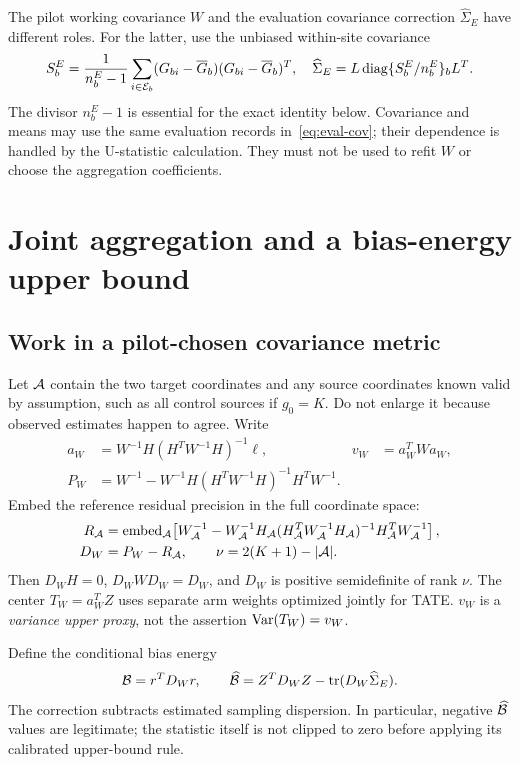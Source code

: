 The pilot working covariance $W$ and the evaluation covariance correction
$\widehat\Sigma_E$ have different roles. For the latter, use the unbiased
within-site covariance
\begin{equation}
 S_b^E=\frac{1}{n_b^E-1}\sum_{i\in\mathcal E_b}
 (G_{bi}-\overline G_b)(G_{bi}-\overline G_b)^T,
 \quad\widehat\Sigma_E=L\operatorname{diag}\{S_b^E/n_b^E\}_bL^T.\label{eq:eval-cov}
\end{equation}
The divisor $n_b^E-1$ is essential for the exact identity below. Covariance
and means may use the same evaluation records in~\eqref{eq:eval-cov}; their
dependence is handled by the U-statistic calculation. They must not be used
to refit $W$ or choose the aggregation coefficients.

\section{Joint aggregation and a bias-energy upper bound}

\subsection{Work in a pilot-chosen covariance metric}
Let $\mathcal A$ contain the two target coordinates and any source coordinates known
valid by assumption, such as all control sources if $g_0=K$. Do not enlarge it
because observed estimates happen to agree. Write
\begin{align}
 a_W&=W^{-1}H(H^TW^{-1}H)^{-1}\ell,& v_W&=a_W^TWa_W,\\
 P_W&=W^{-1}-W^{-1}H(H^TW^{-1}H)^{-1}H^TW^{-1}.\nonumber
\end{align}
Embed the reference residual precision in the full coordinate space:
\begin{align}
 R_{\mathcal A}&=\operatorname{embed}_{\mathcal A}\!\left[
 W_{\mathcal A}^{-1}-W_{\mathcal A}^{-1}H_{\mathcal A}
 (H_{\mathcal A}^TW_{\mathcal A}^{-1}H_{\mathcal A})^{-1}
 H_{\mathcal A}^TW_{\mathcal A}^{-1}\right],\\
 D_W&=P_W-R_{\mathcal A},\qquad \nu=2(K+1)-|\mathcal A|.
\end{align}
Then $D_WH=0$, $D_WWD_W=D_W$, and $D_W$ is positive semidefinite of rank
$\nu$. The center $T_W=a_W^TZ$ uses separate arm weights optimized jointly
for TATE. $v_W$ is a \emph{variance upper proxy}, not the assertion
$\operatorname{Var}(T_W)=v_W$.

Define the conditional bias energy
\begin{equation}
 \mathcal B=r^TD_Wr,\qquad
 \widehat{\mathcal B}=Z^TD_WZ-\operatorname{tr}(D_W\widehat\Sigma_E).\label{eq:debiased-energy}
\end{equation}
The correction subtracts estimated sampling dispersion. In particular,
negative $\widehat{\mathcal B}$ values are legitimate; the statistic itself is not
clipped to zero before applying its calibrated upper-bound rule.

